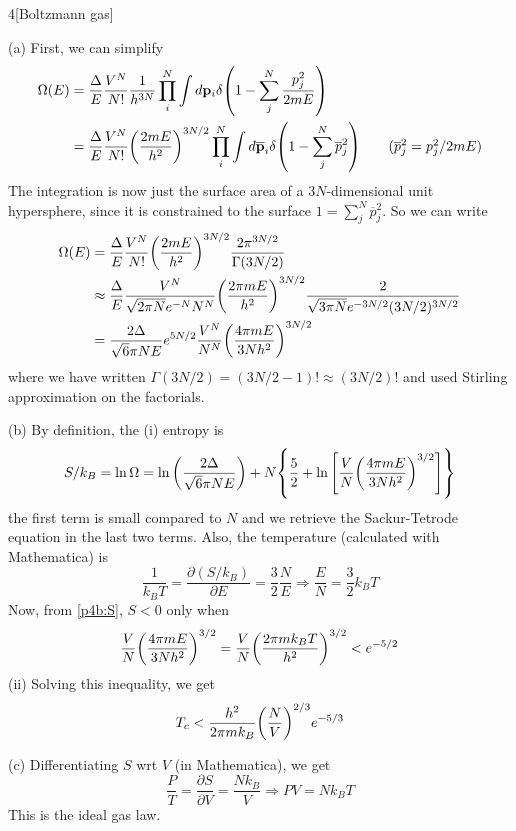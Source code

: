 \documentclass[12pt]{article}
\begin{document}
\begin{problem}{4}[Boltzmann gas]
\begin{solution}
(a) First, we can simplify
\begin{align}
    \Omega(E)
    &=\frac{\Delta}{E}\frac{V^N}{N!}\frac1{h^{3N}}\prod_i^N\int
    d\vb{p}_i\delta\qty(1-\sum_j^N\frac{p_j^2}{2mE})\notag\\
    &=\frac{\Delta}{E}\frac{V^N}{N!}\qty(\frac{2mE}{h^2})^{3N/2}\prod_i^N\int
    d\overline{\vb{p}}_i\delta\qty(1-\sum_j^N\overline{p}_j^2)\tag{$\overline{p}_j^2=p_j^2/2mE$}
\end{align}
The integration is now just the surface area of a $3N$-dimensional unit
hypersphere, since it is constrained to the surface
$1=\sum_j^N\overline{p}_j^2$. So we can write
\begin{align}
    \Omega(E)
    &=\frac{\Delta}{E}\frac{V^N}{N!}\qty(\frac{2mE}{h^2})^{3N/2}\frac{2\pi^{3N/2}}{\Gamma(3N/2)}\notag\\
    &\approx\frac{\Delta}{E}\frac{V^N}{\sqrt{2\pi N}e^{-N}N^N}\qty(\frac{2\pi
    mE}{h^2})^{3N/2}\frac{2}{\sqrt{3\pi N}e^{-3N/2}(3N/2)^{3N/2}}\notag\\
    &=\frac{2\Delta}{\sqrt6\pi NE}e^{5N/2}\frac{V^N}{N^N}\qty(\frac{4\pi
    mE}{3Nh^2})^{3N/2}
\end{align}
where we have written $\Gamma(3N/2)=(3N/2-1)!\approx(3N/2)!$ and used Stirling
approximation on the factorials.

(b) By definition, the (i) entropy is
\begin{equation}\label{p4b:S}
    S/k_B=\ln\Omega
    =\ln\qty(\frac{2\Delta}{\sqrt6\pi NE})+N\qty{\frac52
    +\ln\qty[\frac{V}{N}\qty(\frac{4\pi mE}{3Nh^2})^{3/2}]}
\end{equation}
the first term is small compared to $N$ and we retrieve the Sackur-Tetrode
equation in the last two terms. Also, the temperature (calculated with
Mathematica) is
\begin{equation}
    \frac1{k_BT}=\frac{\partial(S/k_B)}{\partial E}=\frac{3}2\frac{N}{E} 
    \Rightarrow\frac{E}{N}=\frac32k_BT
\end{equation}
Now, from \eqref{p4b:S}, $S<0$ only when
\begin{equation}
    \frac{V}{N}\qty(\frac{4\pi mE}{3Nh^2})^{3/2}
    =\frac{V}{N}\qty(\frac{2\pi mk_BT}{h^2})^{3/2}<e^{-5/2}
\end{equation}
(ii) Solving this inequality, we get
\begin{equation}
    T_c<\frac{h^2}{2\pi mk_B}\qty(\frac{N}{V})^{2/3}e^{-5/3}
\end{equation}

(c) Differentiating $S$ wrt $V$ (in Mathematica), we get
\begin{equation}
    \frac{P}{T}=\frac{\partial S}{\partial V}=\frac{Nk_B}{V} 
    \Rightarrow PV=Nk_BT
\end{equation}
This is the ideal gas law.


\end{solution}
\end{problem}
\end{document}
